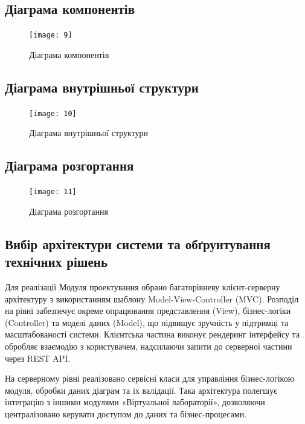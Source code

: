 \documentclass[oneside,14pt]{extarticle}
\begin{document}
\begin{normalsize}
	\subsection{Діаграма компонентів}
	\begin{figure}[H]
		\centering
		\texttt{[image: 9]}
		\caption{Діаграма компонентів}
	\end{figure}
	
	\subsection{Діаграма внутрішньої структури}
	\begin{figure}[H]
		\centering
		\texttt{[image: 10]}
		\caption{Діаграма внутрішньої структури}
	\end{figure}
	
	\subsection{Діаграма розгортання}
	\begin{figure}[H]
		\centering
		\texttt{[image: 11]}
		\caption{Діаграма розгортання}
	\end{figure}
	
	\subsection{Вибір архітектури системи та обґрунтування технічних рішень}
	Для реалізації Модуля проектування обрано багаторівневу клієнт-серверну архітектуру з використанням шаблону Model-View-Controller (MVC). Розподіл на рівні забезпечує окреме опрацювання представлення (View), бізнес-логіки (Controller) та моделі даних (Model), що підвищує зручність у підтримці та масштабованості системи. Клієнтська частина виконує рендеринг інтерфейсу та обробляє взаємодію з користувачем, надсилаючи запити до серверної частини через REST API.
	
	На серверному рівні реалізовано сервісні класи для управління бізнес-логікою модуля, обробки даних діаграм та їх валідації. Така архітектура полегшує інтеграцію з іншими модулями «Віртуальної лабораторії», дозволяючи централізовано керувати доступом до даних та бізнес-процесами.
	

\end{normalsize}
\end{document}

